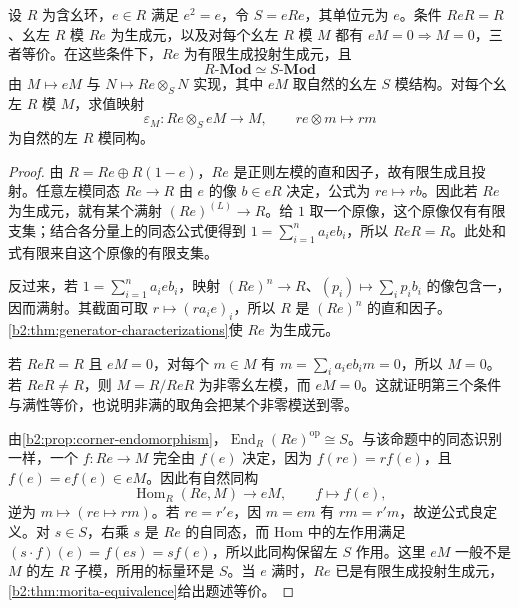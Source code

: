 \begin{proposition}[满幂等角环]\label{b2:prop:full-idempotent-morita}
	设 \(R\) 为含幺环，\(e\in R\) 满足 \(e^2=e\)，令 \(S=eRe\)，其单位元为 \(e\)。条件 \(ReR=R\)、幺左 \(R\) 模 \(Re\) 为生成元，以及对每个幺左 \(R\) 模 \(M\) 都有 \(eM=0\Longrightarrow M=0\)，三者等价。在这些条件下，\(Re\) 为有限生成投射生成元，且
	\[
		R\text{-}\mathbf{Mod}\simeq S\text{-}\mathbf{Mod}
	\]
	由 \(M\mapsto eM\) 与 \(N\mapsto Re\otimes_SN\) 实现，其中 \(eM\) 取自然的幺左 \(S\) 模结构。对每个幺左 \(R\) 模 \(M\)，求值映射
	\[
		\varepsilon_M:Re\otimes_SeM\longrightarrow M,\qquad re\otimes m\longmapsto rm
	\]
	为自然的左 \(R\) 模同构。
\end{proposition}
\begin{proof}
	由 \(R=Re\oplus R(1-e)\)，\(Re\) 是正则左模的直和因子，故有限生成且投射。任意左模同态 \(Re\rightarrow R\) 由 \(e\) 的像 \(b\in eR\) 决定，公式为 \(re\mapsto rb\)。因此若 \(Re\) 为生成元，就有某个满射 \((Re)^{(L)}\rightarrow R\)。给 \(1\) 取一个原像，这个原像仅有有限支集；结合各分量上的同态公式便得到 \(1=\sum_{i=1}^n a_i e b_i\)，所以 \(ReR=R\)。此处和式有限来自这个原像的有限支集。

	反过来，若 \(1=\sum_{i=1}^n a_i e b_i\)，映射 \((Re)^n\rightarrow R\)、\((p_i)\mapsto\sum_i p_i b_i\) 的像包含一，因而满射。其截面可取 \(r\mapsto(ra_i e)_i\)，所以 \(R\) 是 \((Re)^n\) 的直和因子。\cref{b2:thm:generator-characterizations}使 \(Re\) 为生成元。

	若 \(ReR=R\) 且 \(eM=0\)，对每个 \(m\in M\) 有 \(m=\sum_i a_i e b_i m=0\)，所以 \(M=0\)。若 \(ReR\ne R\)，则 \(M=R/ReR\) 为非零幺左模，而 \(eM=0\)。这就证明第三个条件与满性等价，也说明非满的取角会把某个非零模送到零。

	由\cref{b2:prop:corner-endomorphism}，\(\operatorname{End}_R(Re)^{\mathrm{op}}\cong S\)。与该命题中的同态识别一样，一个 \(f:Re\rightarrow M\) 完全由 \(f(e)\) 决定，因为 \(f(re)=rf(e)\)，且 \(f(e)=ef(e)\in eM\)。因此有自然同构
	\[
		\operatorname{Hom}_R(Re,M)\longrightarrow eM,\qquad f\longmapsto f(e),
	\]
	逆为 \(m\mapsto(re\mapsto rm)\)。若 \(re=r'e\)，因 \(m=em\) 有 \(rm=r'm\)，故逆公式良定义。对 \(s\in S\)，右乘 \(s\) 是 \(Re\) 的自同态，而 Hom 中的左作用满足 \((s\cdot f)(e)=f(es)=sf(e)\)，所以此同构保留左 \(S\) 作用。这里 \(eM\) 一般不是 \(M\) 的左 \(R\) 子模，所用的标量环是 \(S\)。当 \(e\) 满时，\(Re\) 已是有限生成投射生成元，\cref{b2:thm:morita-equivalence}给出题述等价。


\end{proof}
